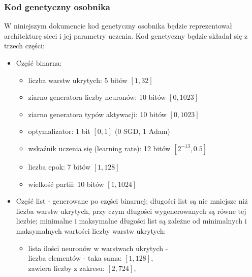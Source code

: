 \subsubsection{Kod genetyczny osobnika}
W niniejszym dokumencie kod genetyczny osobnika będzie reprezentował
architekturę sieci i jej parametry uczenia.
Kod genetyczny będzie składał się z trzech części:
\begin{itemize}
  \setlength{\itemsep}{0pt}
  \setlength{\parskip}{0pt}
  \item Część binarna:
    \begin{itemize}
      \setlength{\itemsep}{0pt}
      \setlength{\parskip}{0pt}
      \item liczba warstw ukrytych: 5 bitów $\left[1, 32\right]$
      \item ziarno generatora liczby neuronów: 10 bitów $\left[0, 1023\right]$
      \item ziarno generatora typów aktywacji: 10 bitów $\left[0, 1023\right]$
      \item optymalizator: 1 bit $\left[0, 1\right]$ (0 \textrightarrow SGD, 1 \textrightarrow Adam)
      \item wskaźnik uczenia się (learning rate): 12 bitów $\left[2^{-13}, 0.5\right]$
      \item liczba epok: 7 bitów $\left[1, 128\right]$
      \item wielkość partii: 10 bitów $\left[1, 1024\right]$
    \end{itemize}
  \item Część list - generowane po części binarnej;
    długości list są nie mniejsze niż liczba warstw ukrytych,
    przy czym długości wygenerowanych są równe tej liczbie;
    minimalne i maksymalne długości list są zależne
    od minimalnych i maksymalnych wartości liczby warstw ukrytych:
    \begin{itemize}
      \setlength{\itemsep}{0pt}
      \setlength{\parskip}{0pt}
      \item lista ilości neuronów w warstwach ukrytych -\\
        \hspace*{1em}liczba elementów - taka sama:
          $\left[1, 128\right]$,\\
        \hspace*{1em}zawiera liczby z zakresu:
          $\left[2, 724\right]$,\\

\end{itemize}
\end{itemize}
